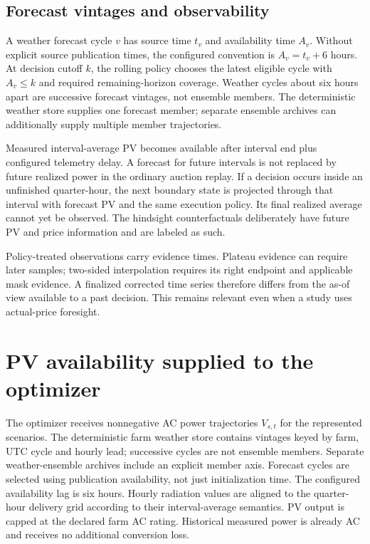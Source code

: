 \documentclass[11pt,a4paper]{article}
\begin{document}
\subsection{Forecast vintages and observability}
A weather forecast cycle $v$ has source time $t_v$ and availability time $A_v$.
Without explicit source publication times, the configured convention is
$A_v=t_v+6$ hours. At decision cutoff $k$, the rolling policy chooses the latest
eligible cycle with $A_v\le k$ and required remaining-horizon coverage. Weather
cycles about six hours apart are successive forecast vintages, not ensemble
members. The deterministic weather store supplies one forecast member; separate
ensemble archives can additionally supply multiple member trajectories.

Measured interval-average PV becomes available after interval end plus configured
telemetry delay. A forecast for future intervals is not replaced by future
realized power in the ordinary auction replay. If a decision occurs inside an
unfinished quarter-hour, the next boundary state is projected through that
interval with forecast PV and the same execution policy. Its final realized
average cannot yet be observed. The hindsight counterfactuals deliberately have
future PV and price information and are labeled as such.

Policy-treated observations carry evidence times. Plateau evidence can require
later samples; two-sided interpolation requires its right endpoint and applicable
mask evidence. A finalized corrected time series therefore differs from the
as-of view available to a past decision. This remains relevant even when a study
uses actual-price foresight.

\section{PV availability supplied to the optimizer}
\label{sec:pv-input}

The optimizer receives nonnegative AC power trajectories $V_{s,t}$ for the
represented scenarios. The deterministic farm weather store contains vintages keyed
by farm, UTC cycle and hourly lead; successive cycles are not ensemble
members. Separate weather-ensemble archives include an explicit member axis.
Forecast cycles are selected using publication availability, not just
initialization time. The configured availability lag is six hours. Hourly
radiation values are aligned to the quarter-hour delivery grid according to
their interval-average semantics. PV output is capped at the declared farm AC
rating. Historical measured power is already AC and receives no additional
conversion loss.
\end{document}
